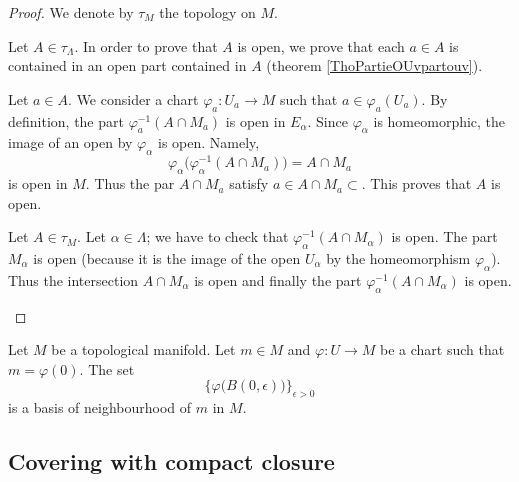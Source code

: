 \begin{proof}
	We denote by \( \tau_M\) the topology on \( M\).
	\begin{subproof}
		Let \( A\in \tau_{\Lambda}\). In order to prove that \( A\) is open, we prove that each \( a\in A\) is contained in an open part contained in \( A\) (theorem \ref{ThoPartieOUvpartouv}).

		Let \( a\in A\). We consider a chart \(\varphi_a \colon U_a\to M  \) such that \( a\in\varphi_a(U_a)\). By definition, the part \( \varphi_a^{-1}(A\cap M_a)\) is open in \( E_{\alpha}\). Since \( \varphi_{\alpha}\) is homeomorphic, the image of an open by \( \varphi_{\alpha}\) is open. Namely,
		\begin{equation}
			\varphi_{\alpha}\Big( \varphi_{\alpha}^{-1}(A\cap M_a) \Big)=A\cap M_a
		\end{equation}
		is open in \( M\). Thus the par \( A\cap M_a\) satisfy \( a\in A\cap M_a\subset\). This proves that \( A\) is open.

		Let \( A\in \tau_M\). Let \( \alpha\in\Lambda\); we have to check that \( \varphi_{\alpha}^{-1}(A\cap M_{\alpha})\) is open. The part \( M_{\alpha}\) is open (because it is the image of the open \( U_{\alpha}\) by the homeomorphism \( \varphi_{\alpha}\)). Thus the intersection \( A\cap M_{\alpha}\) is open and finally the part \( \varphi_{\alpha}^{-1}(A\cap M_{\alpha})\) is open.
	\end{subproof}
\end{proof}

\begin{proposition}			\label{PROPooGAZZooWIPVuf}
	Let \( M\) be a topological manifold. Let \( m\in M\) and \(\varphi \colon U\to M  \) be a chart such that \( m=\varphi(0)\). The set
	\begin{equation}
		\{ \varphi\big( B(0,\epsilon) \big) \}_{\epsilon>0}
	\end{equation}
	is a basis of neighbourhood of \( m\) in \( M\).
\end{proposition}


\subsection{Covering with compact closure}

